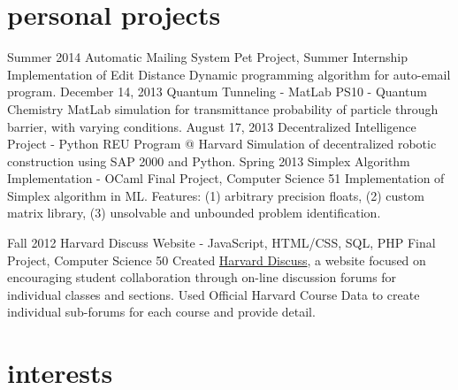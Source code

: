\documentclass[]{friggeri-cv} %
\begin{document}

\section{personal projects}

\entry
{Summer 2014}
{Automatic Mailing System}
{Pet Project, Summer Internship}
{Implementation of Edit Distance Dynamic programming algorithm for auto-email program.}
\entry
{December 14, 2013}
{Quantum Tunneling - MatLab}
{PS10 - Quantum Chemistry}
{MatLab simulation for transmittance probability of particle through barrier, with varying conditions.}
\entry
{August 17, 2013}
{Decentralized Intelligence Project - Python}
{REU Program @ Harvard}
{Simulation of decentralized robotic construction using SAP 2000 and Python.}
\entry
{Spring 2013}
{Simplex Algorithm Implementation - OCaml}
{Final Project, Computer Science 51}
{Implementation of Simplex algorithm in ML. Features: (1) arbitrary precision floats, (2) custom matrix library, (3) unsolvable and unbounded problem identification.}
\begin{detailed}
\entry
{Fall 2012}
{Harvard Discuss Website - JavaScript, HTML/CSS, SQL, PHP}
{Final Project, Computer Science 50}
{Created \href{https://www.hcs.harvard.edu/~harvarddiscuss/index.php/en/}{Harvard Discuss}, a website focused on encouraging student collaboration through on-line discussion forums for individual classes and sections. Used Official Harvard Course Data to create individual sub-forums for each course and provide detail.}
\end{detailed}


\section{interests}
\end{document}
